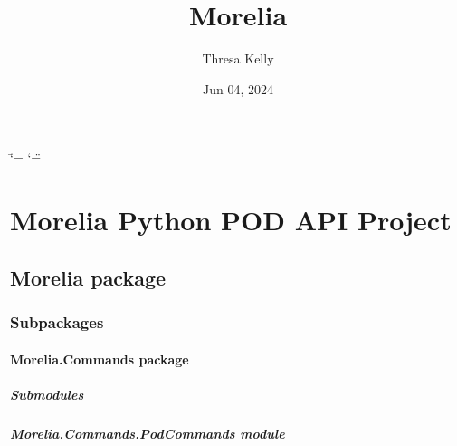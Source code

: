 \documentclass[letterpaper,10pt,english]{sphinxmanual}
\title{Morelia}
\date{Jun 04, 2024}
\author{Thresa Kelly}
\begin{document}
\ifdefined\shorthandoff
  \ifnum\catcode`\=\string=\active\shorthandoff{=}\fi
  \ifnum\catcode`\"=\active{}\fi
\fi

\pagestyle{empty}
\sphinxmaketitle
\pagestyle{plain}
\sphinxtableofcontents
\pagestyle{normal}
\label{\detokenize{index::doc}}


\sphinxstepscope


\chapter{Morelia Python POD API Project}
\label{\detokenize{modules:morelia-python-pod-api-project}}\label{\detokenize{modules::doc}}
\sphinxstepscope


\section{Morelia package}
\label{\detokenize{Morelia:morelia-package}}\label{\detokenize{Morelia::doc}}

\subsection{Subpackages}
\label{\detokenize{Morelia:subpackages}}
\sphinxstepscope


\subsubsection{Morelia.Commands package}
\label{\detokenize{Morelia.Commands:morelia-commands-package}}\label{\detokenize{Morelia.Commands::doc}}

\paragraph{Submodules}
\label{\detokenize{Morelia.Commands:submodules}}

\paragraph{Morelia.Commands.PodCommands module}
\label{\detokenize{Morelia.Commands:module-Morelia.Commands.PodCommands}}\label{\detokenize{Morelia.Commands:morelia-commands-podcommands-module}}
\end{document}
